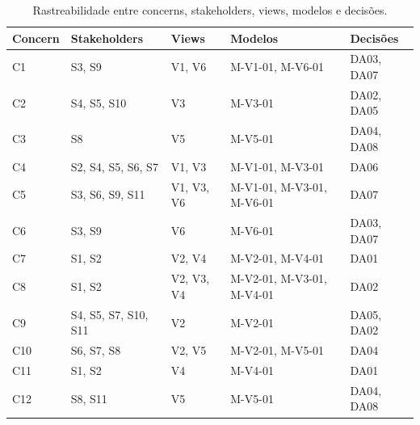 \begin{table}[H]
\caption{Rastreabilidade entre concerns, stakeholders, views, modelos e decisões.}
\label{tab:rastreabilidade}
\centering
\small
\begin{tabularx}{\textwidth}{|l|X|l|l|l|}
\hline
\textbf{Concern} & \textbf{Stakeholders} & \textbf{Views} & \textbf{Modelos} & \textbf{Decisões} \\
\hline
C1  & S3, S9               & V1, V6     & M-V1-01, M-V6-01                    & DA03, DA07 \\
C2  & S4, S5, S10          & V3         & M-V3-01                             & DA02, DA05 \\
C3  & S8                   & V5         & M-V5-01                             & DA04, DA08 \\
C4  & S2, S4, S5, S6, S7   & V1, V3     & M-V1-01, M-V3-01                    & DA06       \\
C5  & S3, S6, S9, S11      & V1, V3, V6 & M-V1-01, M-V3-01, M-V6-01          & DA07       \\
C6  & S3, S9               & V6         & M-V6-01                             & DA03, DA07 \\
C7  & S1, S2               & V2, V4     & M-V2-01, M-V4-01                    & DA01       \\
C8  & S1, S2               & V2, V3, V4 & M-V2-01, M-V3-01, M-V4-01          & DA02       \\
C9  & S4, S5, S7, S10, S11 & V2         & M-V2-01                             & DA05, DA02 \\
C10 & S6, S7, S8           & V2, V5     & M-V2-01, M-V5-01                    & DA04       \\
C11 & S1, S2               & V4         & M-V4-01                             & DA01       \\
C12 & S8, S11              & V5         & M-V5-01                             & DA04, DA08 \\
\hline
\end{tabularx}
\end{table}